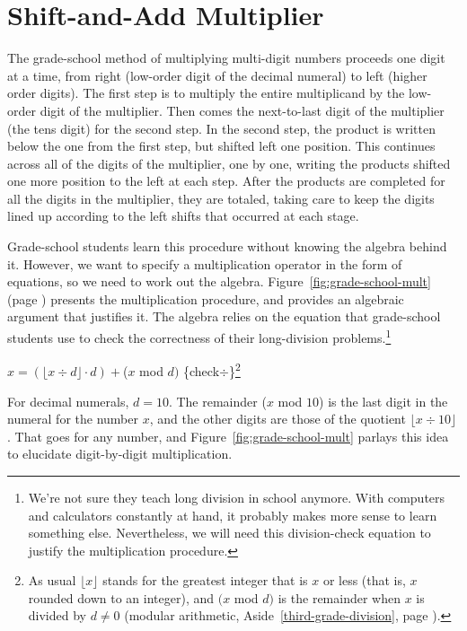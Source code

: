 \section{Shift-and-Add Multiplier}
\label{sec:bignum-mult}

The grade-school method of multiplying multi-digit numbers proceeds one digit at a time,
from right (low-order digit of the decimal numeral) to left (higher order digits).
The first step is to multiply the entire multiplicand by the low-order digit
of the multiplier.
Then comes the next-to-last digit of the multiplier (the tens digit) for the second step.
In the second step, the product is written below the one from the first step,
but shifted left one position.
This continues across all of the digits of the multiplier, one by one,
writing the products shifted one more position to the left at each step.
After the products are completed for
all the digits in the multiplier, they are totaled, taking care to keep
the digits lined up according to the left shifts that occurred at each stage.

Grade-school students learn this procedure
without knowing the algebra behind it.
However, we want to specify a
multiplication operator in the form of equations,
so we need to work out the algebra.
Figure~\ref{fig:grade-school-mult} (page \pageref{fig:grade-school-mult})
presents the multiplication procedure,
and provides an algebraic argument that justifies it.
The algebra relies on the equation
that grade-school students use to check the correctness of their long-division
problems.\footnote{We're not
sure they teach long division in school anymore.
With computers and calculators constantly at hand,
it probably makes more sense to learn something else.
Nevertheless, we will need this
division-check equation to justify the multiplication procedure.}

\hspace{2mm} $x = (\lfloor x \div d \rfloor \cdot d) + $($x$ mod $d)$ \hfill \{check$\div$\}\footnote{As
usual $\lfloor x\rfloor$ stands for the greatest integer that is $x$ or less
(that is, $x$ rounded down to an integer),
and $(x$ mod $d)$ is the remainder when $x$ is divided by $d \neq 0$ (modular arithmetic,
Aside~\ref{third-grade-division}, page \pageref{third-grade-division}).}
\vspace{2mm}

For decimal numerals,  $d = 10$.
The remainder ($x$ mod $10$) is the last digit in the numeral for the number $x$,
and the other digits are those of the quotient $\lfloor x \div 10 \rfloor$.
That goes for any number, and
Figure~\ref{fig:grade-school-mult}
parlays this idea to elucidate digit-by-digit multiplication.

